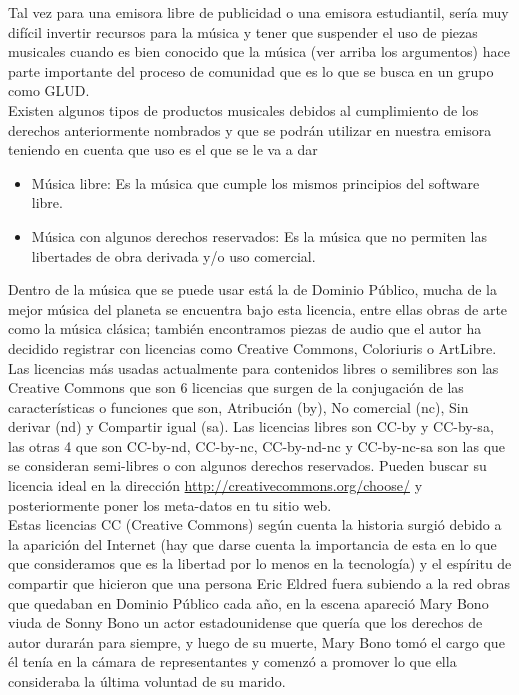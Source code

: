 \begin{multicols}{2}


Tal vez para una emisora libre de publicidad o una emisora estudiantil, sería muy difícil invertir recursos para la música y tener que suspender el uso de piezas musicales cuando es bien conocido que la música (ver arriba los argumentos) hace parte importante del proceso de comunidad que es lo que se busca en un grupo como GLUD.\\

Existen algunos tipos de productos musicales debidos al cumplimiento de los derechos anteriormente nombrados y que se podrán utilizar en nuestra emisora teniendo en cuenta que uso es el que se le va a dar
\begin{itemize}
\item Música libre: Es la música que cumple los mismos principios del software libre.
\item Música con algunos derechos reservados: Es la música que no permiten las libertades de obra derivada y/o uso comercial.
\end{itemize}

Dentro de la música que se puede usar está la de Dominio Público, mucha de la mejor música del planeta se encuentra bajo esta licencia, entre ellas obras de arte como la música clásica; también encontramos piezas de audio que el autor ha decidido registrar con licencias como Creative Commons, Coloriuris o ArtLibre.\\

Las licencias más usadas actualmente para contenidos libres o semilibres son las Creative Commons que son 6 licencias que surgen de la conjugación de las características o funciones que son, Atribución (by), No comercial (nc), Sin derivar (nd) y Compartir igual (sa). Las licencias libres\cite {ref2} son CC-by y CC-by-sa, las otras 4 que son CC-by-nd, CC-by-nc, CC-by-nd-nc y CC-by-nc-sa son las que se consideran semi-libres o con algunos derechos reservados. Pueden buscar su licencia ideal en la dirección \url{http://creativecommons.org/choose/} y posteriormente poner los meta-datos en tu sitio web.\\

Estas licencias CC (Creative Commons) según cuenta la historia surgió debido a la aparición del Internet (hay que darse cuenta la importancia de esta en lo que que consideramos que es la libertad por lo menos en la tecnología) y el espíritu de compartir que hicieron que una persona Eric Eldred fuera subiendo a la red obras que quedaban en Dominio Público cada año, en la escena apareció Mary Bono viuda de Sonny Bono un actor estadounidense que quería que los derechos de autor durarán para siempre, y luego de su muerte, Mary Bono tomó el cargo que él tenía en la cámara de representantes y comenzó a promover lo que ella consideraba la última voluntad de su marido.\\


\end{multicols}
